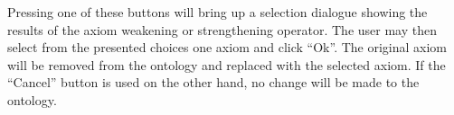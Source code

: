 Pressing one of these buttons will bring up a selection dialogue showing the results of the axiom weakening or strengthening operator. The user may then select from the presented choices one axiom and click ``Ok''. The original axiom will be removed from the ontology and replaced with the selected axiom. If the ``Cancel'' button is used on the other hand, no change will be made to the ontology.

